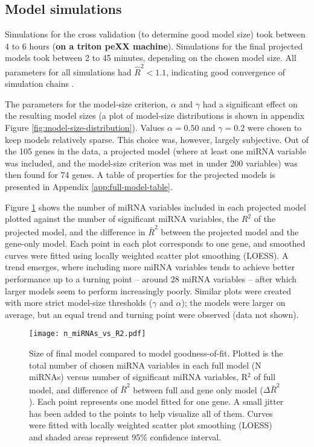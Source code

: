 \subsection{Model simulations}

Simulations for the cross validation (to determine good model size) took
between 4 to 6 hours (\textbf{on a triton peXX machine}). Simulations for the
final projected models took between 2 to 45 minutes, depending on the chosen
model size. All parameters for all simulations had $\hat{R}^2 < 1.1$,
indicating good convergence of simulation chains \citep{Gelman2013}.

The
parameters for the model-size criterion, $\alpha$ and $\gamma$ had a
significant effect on the resulting model sizes (a plot of model-size
distributions is shown in appendix Figure \ref{fig:model-size-distribution}).
Values $\alpha = 0.50$ and
$\gamma = 0.2$ were chosen to keep models relatively sparse. This choice was,
however, largely subjective. Out of the 105 genes in the data, a projected model (where
at least one miRNA variable was included, and the model-size criterion was met
in under 200 variables) was then found for 74 genes. 
A table of properties for the projected models is presented in Appendix
\ref{app:full-model-table}.

Figure \ref{n-miRNAs-vs-R2} shows the number of miRNA variables included in
each projected model plotted against the number of significant miRNA
variables, the $R^2$ of the projected model, and the difference in $\bar{R}^2$
between the projected model and the gene-only model. Each point in each plot
corresponds to one gene, and smoothed curves were fitted using locally
weighted scatter plot smoothing (LOESS). A trend emerges, where including more
miRNA variables tends to achieve better performance up to a turning point --
around 28 miRNA variables -- after which larger models seem to perform
increasingly poorly. Similar plots were created with more strict model-size
thresholds ($\gamma$ and $\alpha$); the models were larger on
average, but an equal trend and turning point were observed (data not shown).

\begin{figure}[!h]
  \centering
  \texttt{[image: n\_miRNAs\_vs\_R2.pdf]}
  \caption{Size of final model compared to model goodness-of-fit. Plotted is the total number of chosen miRNA variables in each full model (N miRNAs) versus number of significant miRNA variables, R$^2$ of full model, and difference of $\bar{R}^2$ between full and gene only model ($\Delta\bar{R}^2$). Each point represents one model fitted for one gene. A small jitter has been added to the points to help visualize all of them. Curves were fitted with locally weighted scatter plot smoothing (LOESS) and shaded areas represent 95\% confidence interval. \label{n-miRNAs-vs-R2}}
\end{figure}

